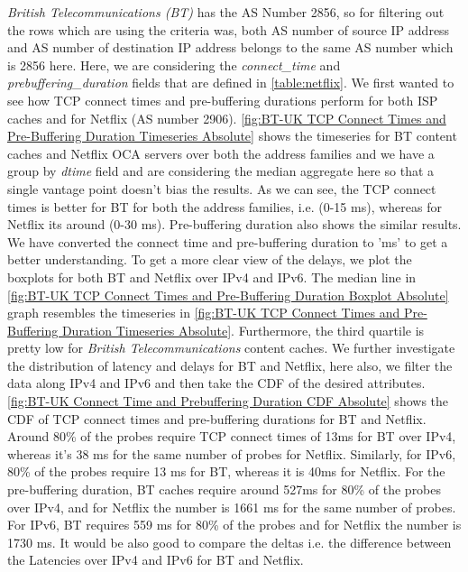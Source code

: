 \textit{British Telecommunications (BT)} has the AS Number 2856, so for filtering out the rows which are using the criteria was, both AS number of source IP address and AS number of destination IP address belongs to
the same AS number which is 2856 here. Here, we are considering the \textit{connect\_time} and \textit{prebuffering\_duration} fields that are defined in \cref{table:netflix}. We first wanted to see how 
TCP connect times and pre-buffering durations perform for both ISP caches and for Netflix (AS number 2906).
\cref{fig:BT-UK TCP Connect Times and Pre-Buffering Duration Timeseries Absolute} shows the timeseries for BT content caches and Netflix OCA servers over both the address families and we have a group by \textit{dtime} field and are considering the median aggregate here so that a single vantage point doesn't bias the results.
As we can see, the TCP connect times is better for BT for both the address families, i.e. (0-15 ms), whereas for Netflix its around (0-30 ms). Pre-buffering duration also shows the similar
results. We have converted the connect time and pre-buffering duration to 'ms' to get a better understanding.
To get a more clear view of the delays, we plot the boxplots for both BT and Netflix over IPv4 and IPv6.  The median line in \cref{fig:BT-UK TCP Connect Times and Pre-Buffering Duration Boxplot Absolute}
graph resembles the timeseries in \cref{fig:BT-UK TCP Connect Times and Pre-Buffering Duration Timeseries Absolute}. Furthermore, the third quartile is pretty low for \textit{British Telecommunications} content caches.
We further investigate the distribution of latency and delays for BT and Netflix, here also, we filter the data along IPv4 and IPv6 and then take the CDF of the desired attributes. 
\cref{fig:BT-UK Connect Time and Prebuffering Duration CDF Absolute} shows the CDF of TCP connect times and pre-buffering durations for BT and Netflix. Around 80\% of the probes require TCP connect times of 13ms
for BT over IPv4, whereas it's 38 ms for the same number of probes for Netflix. Similarly, for IPv6, 80\% of the probes require 13 ms for BT, whereas it is 40ms for Netflix.
For the pre-buffering duration, BT caches require around 527ms for 80\% of the probes over IPv4, and for Netflix the number is 1661 ms for the same number of probes. For IPv6, BT requires
559 ms for 80\% of the probes and for Netflix the number is 1730 ms. It would be also good to compare the deltas i.e. the difference between the Latencies over IPv4 and IPv6 for BT and Netflix.
